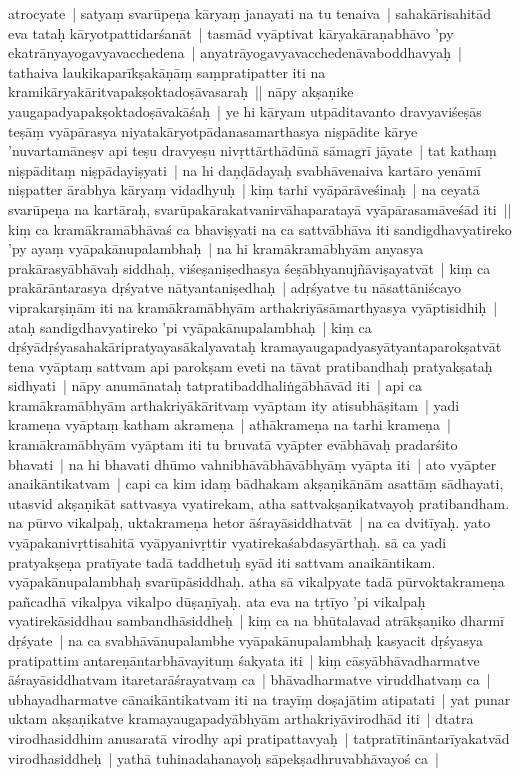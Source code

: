 \documentclass[article,12pt,a4paper]{memoir}
\begin{document}
atrocyate | satyaṃ svarūpeṇa kāryaṃ janayati na tu tenaiva | sahakārisahitād eva tataḥ kāryotpattidarśanāt | tasmād vyāptivat kāryakāraṇabhāvo 'py ekatrānyayogavyavacchedena | anyatrāyogavyavacchedenāvaboddhavyaḥ | tathaiva laukikaparīkṣakāṇāṃ saṃpratipatter iti na kramikāryakāritvapakṣoktadoṣāvasaraḥ || \label{thakur75-86.11} nāpy akṣaṇike yaugapadyapakṣoktadoṣāvakāśaḥ | ye hi kāryam utpāditavanto dravyaviśeṣās teṣāṃ vyāpārasya niyatakāryotpādanasamarthasya niṣpādite kārye 'nuvartamāneṣv api teṣu dravyeṣu nivṛttārthādūnā sāmagrī jāyate | tat kathaṃ niṣpāditaṃ niṣpādayiṣyati | na hi daṇḍādayaḥ svabhāvenaiva kartāro yenāmī niṣpatter ārabhya kāryaṃ vidadhyuḥ | kiṃ tarhi vyāpārāveśinaḥ | na ceyatā svarūpeṇa na kartāraḥ, svarūpakārakatvanirvāhaparatayā vyāpārasamāveśād iti || \label{thakur75-86.17} kiṃ ca kramākramābhāvaś ca bhaviṣyati na ca sattvābhāva iti sandigdhavyatireko 'py ayaṃ vyāpakānupalambhaḥ | na hi kramākramābhyām anyasya prakārasyābhāvaḥ siddhaḥ, viśeṣaniṣedhasya śeṣābhyanujñāviṣayatvāt | \label{thakur75-86.20} kiṃ ca prakārāntarasya dṛśyatve nātyantaniṣedhaḥ | adṛśyatve tu nāsattāniścayo viprakarṣiṇām iti na kramākramābhyām arthakriyāsāmarthyasya vyāptisidhiḥ | ataḥ sandigdhavyatireko 'pi vyāpakānupalambhaḥ | \label{thakur75-86.23} kiṃ ca dṛśyādṛśyasahakāripratyayasākalyavataḥ kramayaugapadyasyātyantaparokṣatvāt tena vyāptaṃ sattvam api parokṣam eveti na tāvat pratibandhaḥ pratyakṣataḥ sidhyati | nāpy anumānataḥ tatpratibaddhaliṅgābhāvād iti | \label{thakur75-86.26} api ca kramākramābhyām arthakriyākāritvaṃ vyāptam ity atisubhāṣitam | yadi krameṇa vyāptaṃ katham akrameṇa | athākrameṇa na tarhi krameṇa | kramākramābhyām vyāptam iti tu bruvatā vyāpter evābhāvaḥ pradarśito bhavati | na hi bhavati dhūmo vahnibhāvābhāvābhyāṃ vyāpta iti | ato vyāpter anaikāntikatvam | \label{thakur75-86.30} capi ca kim idaṃ bādhakam akṣaṇikānām asattāṃ sādhayati, utasvid akṣaṇikāt sattvasya vyatirekam, atha sattvakṣaṇikatvayoḥ pratibandham. \label{thakur75-86.31} na pūrvo vikalpaḥ, uktakrameṇa hetor āśrayāsiddhatvāt | \label{thakur75-87.1} na ca dvitīyaḥ. yato vyāpakanivṛttisahitā vyāpyanivṛttir vyatirekaśabdasyārthaḥ. sā ca yadi pratyakṣeṇa pratīyate tadā taddhetuḥ syād iti sattvam anaikāntikam. vyāpakānupalambhaḥ svarūpāsiddhaḥ. atha sā vikalpyate tadā pūrvoktakrameṇa pañcadhā vikalpya vikalpo dūṣaṇīyaḥ. \label{thakur75-87.4} ata eva na tṛtīyo 'pi vikalpaḥ vyatirekāsiddhau sambandhāsiddheḥ | \label{thakur75-87.6} kiṃ ca na bhūtalavad atrākṣaṇiko dharmī dṛśyate | na ca svabhāvānupalambhe vyāpakānupalambhaḥ kasyacit dṛśyasya pratipattim antareṇāntarbhāvayituṃ śakyata iti | \label{thakur75-87.9} kiṃ cāsyābhāvadharmatve āśrayāsiddhatvam itaretarāśrayatvaṃ ca | bhāvadharmatve viruddhatvaṃ ca | ubhayadharmatve cānaikāntikatvam iti na trayīṃ doṣajātim atipatati | \label{thakur75-87.11} yat punar uktam akṣaṇikatve kramayaugapadyābhyām arthakriyāvirodhād iti | dtatra virodhasiddhim anusaratā virodhy api pratipattavyaḥ | tatpratītināntarīyakatvād virodhasiddheḥ | yathā tuhinadahanayoḥ sāpekṣadhruvabhāvayoś ca | 
\end{document}
